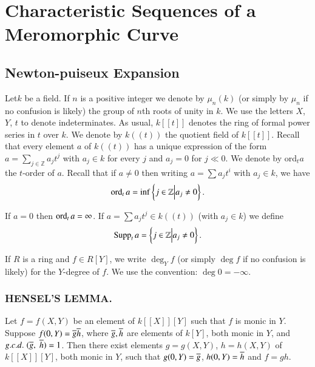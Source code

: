 
\chapter{Characteristic Sequences of a Meromorphic Curve}\label{part1:chap2}

\setcounter{section}{4}
\section{Newton-puiseux Expansion}\label{part1:chap2:sec5}

\begin{notn}\label{part1:chap2:sec5:notn5.1}
  Let\pageoriginale $k$ be a field. If $n$ is a positive integer we
  denote by $\mu_n (k)$ (or simply by $\mu_n$ if no confusion is
  likely) the group of $n$th roots of unity in $k$. We use the letters
  $X$, $Y$, $t$ to denote indeterminates. As usual, $k[[t]]$ denotes
  the ring of formal power series in $t$ over $k$. We denote by
  $k((t))$ the quotient field of $k[[t]]$. Recall that every element $a$
  of $k((t))$ has a unique expression of the form $a=
  \displaystyle{\sum_{j \in \mathbb{Z}}} a_j t^j$ with $a_j \in k$ for
  every $j$ and $a_j = 0$ for $j\ll 0$. We denote by ord$_ta$ the
  $t$-order of $a$. Recall that if $a\neq 0$ then writing $a = \sum
  a_j t^i$ with $a_j \in k$, we have 
$$
\operatorname{ord}_t a = \inf \left\{ j \in \mathbb{Z} \Big| a_j \neq 0 \right\}.
$$
\end{notn}

If $a=0$ then $\operatorname{ord}_t a = \infty$. If $a = \sum a_j t^j \in k ((t))$ (with $a_j \in k$) we define
$$
\operatorname{Supp}_t a = \left\{ j \in \mathbb{Z} \Big| a_j \neq 0 \right\}.
$$

If $R$ is a ring and $f \in R[Y]$, we write $\deg_Y f$ (or simply $\deg f$ if no confusion is likely) for the $Y$-degree of $f$. We use the convention: $\deg 0 =- \infty$.

\setcounter{subsection}{1}
\subsection{HENSEL'S LEMMA.}\label{part1:chap2:sec5:ss5.2}

Let $f= f(X, Y)$ be an element of $k [[X]][Y]$ such that $f$ is monic in $Y$. Suppose $f(0, Y)= \overline{g} \overline{h}$, where $\overline{g}, \overline{h}$ are elements of $k[Y]$, both monic in $Y$, and ${g.c.d.}\kern.3em (\overline{g}, \;  \overline{h})=1$. Then there exist elements $g = g(X, Y)$, $h= h(X, Y)$ of $k[[X]] [Y]$, both monic in $Y$, such that $g(0, Y)= \overline{g}$, $h(0, Y)= \overline{h}$ and $f=gh$.

